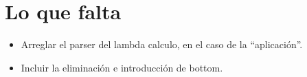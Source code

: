 \documentclass[a4paper,11pt]{article}
\begin{document}
\section{Lo que falta}
\begin{itemize}
  \item Arreglar el parser del lambda calculo, en el caso de la ``aplicación''.
  \item Incluir la eliminación e introducción de bottom.
\end{itemize}
\end{document}
